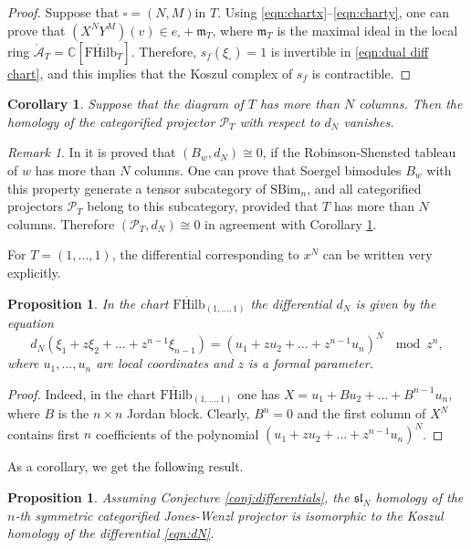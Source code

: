 \documentclass[12pt]{amsart}
\numberwithin{equation}{section}
\newtheorem{proposition}[theorem]{Proposition}
\newtheorem{corollary}[theorem]{Corollary}
\theoremstyle{definition}
\theoremstyle{remark}
\newtheorem{remark}[theorem]{Remark}
\newcommand{\CC}{\mathbb{C}}
\newcommand{\CA}{\mathcal{A}}
\newcommand{\CP}{\mathcal{P}}
\renewcommand{\1}{\mathbf{1}}
\newcommand{\FH}{\mathrm{FHilb}}
\newcommand{\oFH}{\mathring{\FH}}
\newcommand{\SBim}{\mathrm{SBim}}
\newcommand{\fm}{\mathfrak{m}}
\newcommand{\sq}{\square}
\newcommand{\oCA}{\mathring{\CA}}
\newcommand{\fsl}{\mathfrak{sl}}
\begin{document}
\begin{proof}
Suppose that $\sq = (N,M)$in $T$. Using \eqref{eqn:chartx}--\eqref{eqn:charty}, one can prove that $(X^NY^M)(v)\in e_\sq + \fm_T$, where $\fm_T$ is the maximal ideal in the local ring $\oCA_T = \CC[\oFH_T]$. Therefore, $s_f(\xi_\sq)=1$ is invertible in \eqref{eqn:dual diff chart}, and this implies that the Koszul complex of $s_f$ is contractible.
\end{proof}

\begin{corollary}
\label{cor: kill projectors}
Suppose that  the diagram of $T$ has more than $N$ columns.
Then the homology of the categorified projector $\CP_T$ with respect to $d_N$ vanishes.
\end{corollary}

\begin{remark}
In \cite[Theorem 4]{Becker} it is proved that $(B_w,d_N)\cong 0$, if the Robinson-Shensted tableau of $w$ has more than $N$ columns.
One can prove that Soergel bimodules $B_w$ with this property generate a tensor subcategory of $\SBim_n$, and all categorified projectors $\CP_T$ belong to this subcategory, provided that $T$ has more than $N$ columns. Therefore  $(\CP_T,d_N)\cong 0$ in agreement with Corollary \ref{cor: kill projectors}. 
\end{remark}


For $T=(1,\ldots,1)$, the differential corresponding to $x^N$ can be written very explicitly. 
 
\begin{proposition}
In the chart $\oFH_{(1,\ldots,1)}$ the differential $d_N$ is given by the equation
\begin{equation}
\label{eqn:dN}
d_N(\xi_1+z\xi_2+\ldots+z^{n-1}\xi_{n-1})=(u_1+zu_2+\ldots+z^{n-1}u_{n})^{N}\ \mod z^n, 
\end{equation}
where $u_1,\ldots,u_n$ are local coordinates and $z$ is a formal parameter. 
\end{proposition}

\begin{proof} Indeed, in the chart $\oFH_{(1,\ldots,1)}$ one has $X=u_1+Bu_2+\ldots+B^{n-1}u_n$, where $B$ is the  $n\times n$ Jordan block. Clearly, $B^n=0$ and the first column of $X^N$ contains first $n$ coefficients of the polynomial $(u_1+zu_2+\ldots+z^{n-1}u_{n})^{N}$. 
\end{proof}

As a corollary, we get the following result. 

\begin{proposition}
Assuming Conjecture \ref{conj:differentials},
the $\fsl_N$ homology of the $n$-th symmetric categorified Jones-Wenzl projector is isomorphic to
the Koszul homology of the differential \eqref{eqn:dN}.
\end{proposition}
\end{document}
